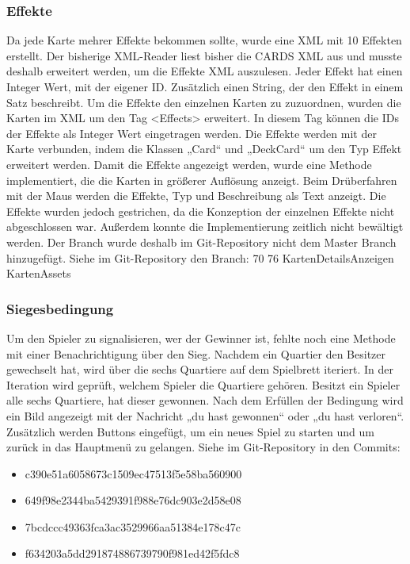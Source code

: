 \subsubsection{Effekte}
Da jede Karte mehrer Effekte bekommen sollte, wurde eine XML mit 10 Effekten erstellt.
Der bisherige XML-Reader liest bisher die CARDS XML aus und musste deshalb erweitert werden, um die Effekte XML auszulesen. Jeder Effekt hat einen Integer Wert, mit der eigener ID.  Zusätzlich einen String, der den Effekt in einem Satz beschreibt.
Um die Effekte den einzelnen Karten zu zuzuordnen, wurden die Karten im XML um den Tag <Effects> erweitert. In diesem Tag können die IDs der Effekte als Integer Wert eingetragen werden. Die Effekte werden mit der Karte verbunden, indem die Klassen „Card“ und „DeckCard“ um den Typ Effekt erweitert werden. Damit die Effekte angezeigt werden, wurde eine Methode implementiert, die die Karten in größerer Auflösung anzeigt. Beim Drüberfahren mit der Maus werden die Effekte, Typ und Beschreibung als Text anzeigt.
Die Effekte wurden jedoch gestrichen, da die Konzeption der einzelnen Effekte nicht abgeschlossen war. Außerdem konnte die Implementierung zeitlich nicht bewältigt werden. Der Branch wurde deshalb im Git-Repository nicht dem Master Branch hinzugefügt.
Siehe im Git-Repository den Branch: 70 76 KartenDetailsAnzeigen KartenAssets

\subsubsection{Siegesbedingung}
Um den Spieler zu signalisieren, wer der Gewinner ist, fehlte noch eine Methode mit einer Benachrichtigung über den Sieg. Nachdem ein Quartier den Besitzer gewechselt hat, wird über die sechs Quartiere auf dem Spielbrett iteriert. In der Iteration wird geprüft, welchem Spieler die Quartiere gehören. Besitzt ein Spieler alle sechs Quartiere, hat dieser gewonnen. Nach dem Erfüllen der Bedingung wird ein Bild angezeigt mit der Nachricht „du hast gewonnen“ oder „du hast verloren“. Zusätzlich werden Buttons eingefügt,  um ein neues Spiel zu starten und um zurück in das Hauptmenü zu gelangen. 
Siehe im Git-Repository in den Commits:
\begin{itemize}
\item c390e51a6058673c1509ec47513f5e58ba560900
\item 649f98e2344ba5429391f988e76dc903e2d58e08
\item 7bcdccc49363fca3ac3529966aa51384e178c47c
\item f634203a5dd291874886739790f981ed42f5fdc8
\end{itemize}

